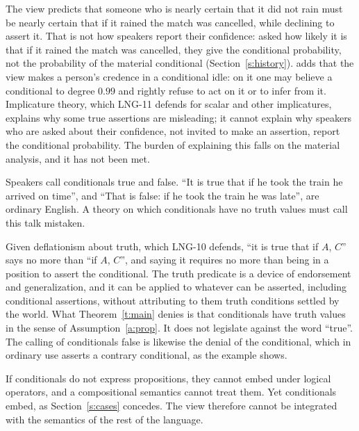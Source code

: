 \documentclass{situationist-preprint}
\begin{document}
\begin{reply}
The view predicts that someone who is nearly certain that it did not rain must be nearly certain that if it rained the match was cancelled, while declining to assert it. That is not how speakers report their confidence: asked how likely it is that if it rained the match was cancelled, they give the conditional probability, not the probability of the material conditional (Section~\ref{s:history}). \citet{Edgington1995} adds that the view makes a person's credence in a conditional idle: on it one may believe a conditional to degree $0.99$ and rightly refuse to act on it or to infer from it. Implicature theory, which LNG-11 defends for scalar and other implicatures, explains why some true assertions are misleading; it cannot explain why speakers who are asked about their confidence, not invited to make an assertion, report the conditional probability. The burden of explaining this falls on the material analysis, and it has not been met.
\end{reply}

\begin{objection}\label{o:true}
Speakers call conditionals true and false. \enquote{It is true that if he took the train he arrived on time}, and \enquote{That is false: if he took the train he was late}, are ordinary English. A theory on which conditionals have no truth values must call this talk mistaken.
\end{objection}

\begin{reply}
Given deflationism about truth, which LNG-10 defends, \enquote{it is true that if $A$, $C$} says no more than \enquote{if $A$, $C$}, and saying it requires no more than being in a position to assert the conditional. The truth predicate is a device of endorsement and generalization, and it can be applied to whatever can be asserted, including conditional assertions, without attributing to them truth conditions settled by the world. What Theorem~\ref{t:main} denies is that conditionals have truth values in the sense of Assumption~\ref{a:prop}. It does not legislate against the word \enquote{true}. The calling of conditionals false is likewise the denial of the conditional, which in ordinary use asserts a contrary conditional, as the example shows.
\end{reply}

\begin{objection}[Embedding]\label{o:embed}
If conditionals do not express propositions, they cannot embed under logical operators, and a compositional semantics cannot treat them. Yet conditionals embed, as Section~\ref{s:cases} concedes. The view therefore cannot be integrated with the semantics of the rest of the language.
\end{objection}
\end{document}
